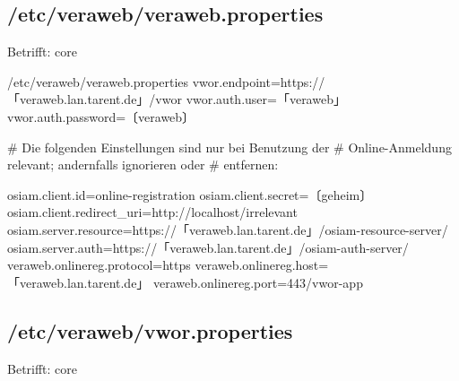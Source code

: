 \documentclass{tarentanleitung}
\begin{document}
\subsection{/etc/veraweb/veraweb.properties}\label{subsec:refcfg-vw-vwprop}

Betrifft: core

\begin{lstdump}{/etc/veraweb/veraweb.properties}
vwor.endpoint=https://「veraweb.lan.tarent.de」/vwor
vwor.auth.user=「veraweb」
vwor.auth.password=〔veraweb〕

# Die folgenden Einstellungen sind nur bei Benutzung der
# Online-Anmeldung relevant; andernfalls ignorieren oder
# entfernen:

osiam.client.id=online-registration
osiam.client.secret=〔geheim〕
osiam.client.redirect_uri=http://localhost/irrelevant
osiam.server.resource=https://「veraweb.lan.tarent.de」/osiam-resource-server/
osiam.server.auth=https://「veraweb.lan.tarent.de」/osiam-auth-server/
veraweb.onlinereg.protocol=https
veraweb.onlinereg.host=「veraweb.lan.tarent.de」
veraweb.onlinereg.port=443/vwor-app
\end{lstdump}

\subsection{/etc/veraweb/vwor.properties}\label{subsec:refcfg-vw-vworprop}

Betrifft: core
\end{document}
